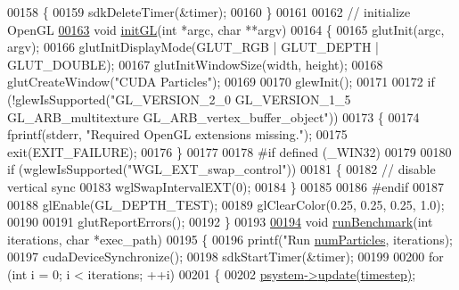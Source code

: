 \begin{DoxyCode}
00158 \{
00159     sdkDeleteTimer(&timer);
00160 \}
00161 
00162 \textcolor{comment}{// initialize OpenGL}
\hypertarget{particles_8cpp_source_l00163}{}\hyperlink{particles_8cpp_a0365f63f071ee9e32dddb2ff65c7628d}{00163} \textcolor{keywordtype}{void} \hyperlink{particles_8cpp_a0365f63f071ee9e32dddb2ff65c7628d}{initGL}(\textcolor{keywordtype}{int} *argc, \textcolor{keywordtype}{char} **argv)
00164 \{
00165     glutInit(argc, argv);
00166     glutInitDisplayMode(GLUT\_RGB | GLUT\_DEPTH | GLUT\_DOUBLE);
00167     glutInitWindowSize(width, height);
00168     glutCreateWindow(\textcolor{stringliteral}{"CUDA Particles"});
00169 
00170     glewInit();
00171 
00172     \textcolor{keywordflow}{if} (!glewIsSupported(\textcolor{stringliteral}{"GL\_VERSION\_2\_0 GL\_VERSION\_1\_5 GL\_ARB\_multitexture
       GL\_ARB\_vertex\_buffer\_object"}))
00173     \{
00174         fprintf(stderr, \textcolor{stringliteral}{"Required OpenGL extensions missing."});
00175         exit(EXIT\_FAILURE);
00176     \}
00177 
00178 #\textcolor{keywordflow}{if} defined (\_WIN32)
00179 
00180     \textcolor{keywordflow}{if} (wglewIsSupported(\textcolor{stringliteral}{"WGL\_EXT\_swap\_control"}))
00181     \{
00182         \textcolor{comment}{// disable vertical sync}
00183         wglSwapIntervalEXT(0);
00184     \}
00185 
00186 #endif
00187 
00188     glEnable(GL\_DEPTH\_TEST);
00189     glClearColor(0.25, 0.25, 0.25, 1.0);
00190 
00191     glutReportErrors();
00192 \}
00193 
\hypertarget{particles_8cpp_source_l00194}{}\hyperlink{particles_8cpp_acd4773d821b4657197abdd8058000f56}{00194} \textcolor{keywordtype}{void} \hyperlink{particles_8cpp_acd4773d821b4657197abdd8058000f56}{runBenchmark}(\textcolor{keywordtype}{int} iterations, \textcolor{keywordtype}{char} *exec\_path)
00195 \{
00196     printf(\textcolor{stringliteral}{"Run %
      \hyperlink{particles_8cpp_a05b8a90212054a3eb1a036ae0c269596}{numParticles}, iterations);
00197     cudaDeviceSynchronize();
00198     sdkStartTimer(&timer);
00199 
00200     \textcolor{keywordflow}{for} (\textcolor{keywordtype}{int} i = 0; i < iterations; ++i)
00201     \{
00202         \hyperlink{particles_8cpp_a6fa81770b30ecffc7110864e64fe4fc5}{psystem}\hyperlink{class_particle_system_a166fd86f020b6024d7d42723762d7cb2}{->}\hyperlink{class_particle_system_a166fd86f020b6024d7d42723762d7cb2}{update}\hyperlink{class_particle_system_a166fd86f020b6024d7d42723762d7cb2}{(}\hyperlink{particles_8cpp_ab9edcc09985767509bf717e25ac80ab7}{timestep}\hyperlink{class_particle_system_a166fd86f020b6024d7d42723762d7cb2}{)};
}
\end{DoxyCode}
